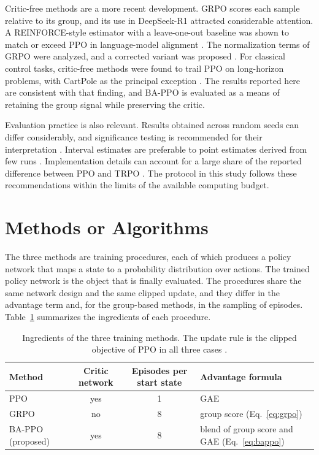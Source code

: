 \documentclass[11pt,a4paper]{article}
\begin{document}
Critic-free methods are a more recent development. GRPO \cite{shao2024deepseekmath} scores each sample relative to its group, and its use in DeepSeek-R1 \cite{deepseekai2025r1} attracted considerable attention. A REINFORCE-style estimator with a leave-one-out baseline was shown to match or exceed PPO in language-model alignment \cite{ahmadian2024reinforce}. The normalization terms of GRPO were analyzed, and a corrected variant was proposed \cite{liu2025r1zero}. For classical control tasks, critic-free methods were found to trail PPO on long-horizon problems, with CartPole as the principal exception \cite{marquesdeoliveira2025critics}. The results reported here are consistent with that finding, and BA-PPO is evaluated as a means of retaining the group signal while preserving the critic.

Evaluation practice is also relevant. Results obtained across random seeds can differ considerably, and significance testing is recommended for their interpretation \cite{henderson2018matters}. Interval estimates are preferable to point estimates derived from few runs \cite{agarwal2021precipice}. Implementation details can account for a large share of the reported difference between PPO and TRPO \cite{engstrom2020implementation}. The protocol in this study follows these recommendations within the limits of the available computing budget.

\section{Methods or Algorithms}
\label{sec:methods}

The three methods are training procedures, each of which produces a policy network that maps a state to a probability distribution over actions. The trained policy network is the object that is finally evaluated. The procedures share the same network design and the same clipped update, and they differ in the advantage term and, for the group-based methods, in the sampling of episodes. Table~\ref{tab:methods} summarizes the ingredients of each procedure.

\begin{table}[t]
\centering
\caption{Ingredients of the three training methods. The update rule is the clipped objective of PPO in all three cases \cite{schulman2017ppo}.}
\label{tab:methods}
\begin{tabular}{@{}lccl@{}}
\toprule
Method & Critic network & Episodes per start state & Advantage formula \\
\midrule
PPO \cite{schulman2017ppo} & yes & 1 & GAE \cite{schulman2016gae} \\
GRPO \cite{shao2024deepseekmath} & no & 8 & group score (Eq.~\ref{eq:grpo}) \\
BA-PPO (proposed) & yes & 8 & blend of group score and GAE (Eq.~\ref{eq:bappo}) \\
\bottomrule
\end{tabular}
\end{table}
\end{document}
